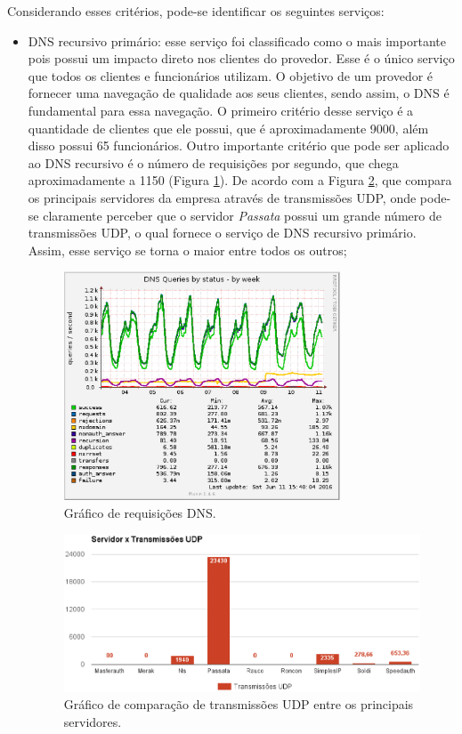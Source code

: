 Considerando esses critérios, pode-se identificar os seguintes serviços:
\begin{itemize}
 \item \ac{DNS} recursivo primário: esse serviço foi classificado como o mais importante pois possui um impacto direto nos clientes do provedor. 
 Esse é o único serviço que todos os clientes e funcionários utilizam. O objetivo de um provedor é fornecer uma navegação de qualidade aos seus 
 clientes, sendo assim, o \ac{DNS} é fundamental para essa navegação. O primeiro critério desse serviço é a quantidade de clientes
 que ele possui, que é aproximadamente 9000, além disso possui 65 funcionários. Outro importante critério que pode ser aplicado ao \ac{DNS} recursivo é o número de 
 requisições por segundo, que chega aproximadamente a 1150 (Figura \ref{fig:passata_week}). De acordo com a Figura \ref{fig:servico_udp}, que 
 compara os principais servidores da empresa através de transmissões \ac{UDP}, onde pode-se claramente perceber que o servidor \textit{Passata}
 possui um grande número de transmissões \ac{UDP}, o qual fornece o serviço de \ac{DNS} recursivo primário. 
 Assim, esse serviço se torna o maior entre todos os outros;
 
\begin{figure}[h!]
 \centering
 \includegraphics[width=310px]{img/passata_week.eps}
 \caption{Gráfico de requisições DNS.}
 \label{fig:passata_week}
\end{figure}

\begin{figure}[h!]
 \centering
 \includegraphics[width=430px]{img/servico_udp.eps}
 \caption{Gráfico de comparação de transmissões UDP entre os principais servidores.}
 \label{fig:servico_udp}
\end{figure}


\end{itemize}
